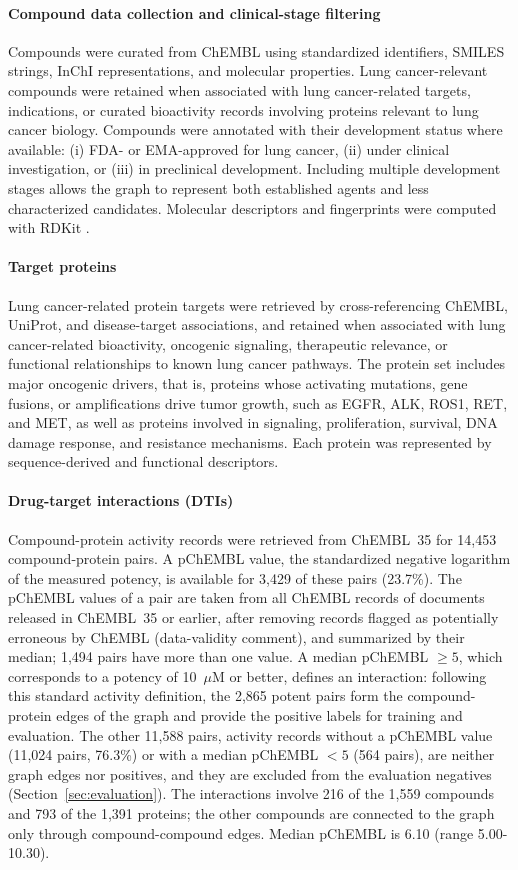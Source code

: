 \documentclass[11pt,letterpaper]{article}
\begin{document}
\paragraph{Compound data collection and clinical-stage filtering}
Compounds were curated from ChEMBL using standardized identifiers, SMILES strings, InChI representations, and molecular properties. Lung cancer-relevant compounds were retained when associated with lung cancer-related targets, indications, or curated bioactivity records involving proteins relevant to lung cancer biology. Compounds were annotated with their development status where available: (i) FDA- or EMA-approved for lung cancer, (ii) under clinical investigation, or (iii) in preclinical development. Including multiple development stages allows the graph to represent both established agents and less characterized candidates. Molecular descriptors and fingerprints were computed with RDKit \cite{landrum_rdkit}.

\paragraph{Target proteins}
Lung cancer-related protein targets were retrieved by cross-referencing ChEMBL, UniProt, and disease-target associations, and retained when associated with lung cancer-related bioactivity, oncogenic signaling, therapeutic relevance, or functional relationships to known lung cancer pathways. The protein set includes major oncogenic drivers, that is, proteins whose activating mutations, gene fusions, or amplifications drive tumor growth, such as EGFR, ALK, ROS1, RET, and MET, as well as proteins involved in signaling, proliferation, survival, DNA damage response, and resistance mechanisms. Each protein was represented by sequence-derived and functional descriptors.

\paragraph{Drug-target interactions (DTIs)}
Compound-protein activity records were retrieved from ChEMBL~35 for 14,453 compound-protein pairs. A pChEMBL value, the standardized negative logarithm of the measured potency, is available for 3,429 of these pairs (23.7\%). The pChEMBL values of a pair are taken from all ChEMBL records of documents released in ChEMBL~35 or earlier, after removing records flagged as potentially erroneous by ChEMBL (data-validity comment), and summarized by their median; 1,494 pairs have more than one value. A median pChEMBL $\geq 5$, which corresponds to a potency of 10~$\mu$M or better, defines an interaction: following this standard activity definition, the 2,865 potent pairs form the compound-protein edges of the graph and provide the positive labels for training and evaluation. The other 11,588 pairs, activity records without a pChEMBL value (11,024 pairs, 76.3\%) or with a median pChEMBL $<5$ (564 pairs), are neither graph edges nor positives, and they are excluded from the evaluation negatives (Section~\ref{sec:evaluation}). The interactions involve 216 of the 1,559 compounds and 793 of the 1,391 proteins; the other compounds are connected to the graph only through compound-compound edges. Median pChEMBL is 6.10 (range 5.00-10.30).
\end{document}
